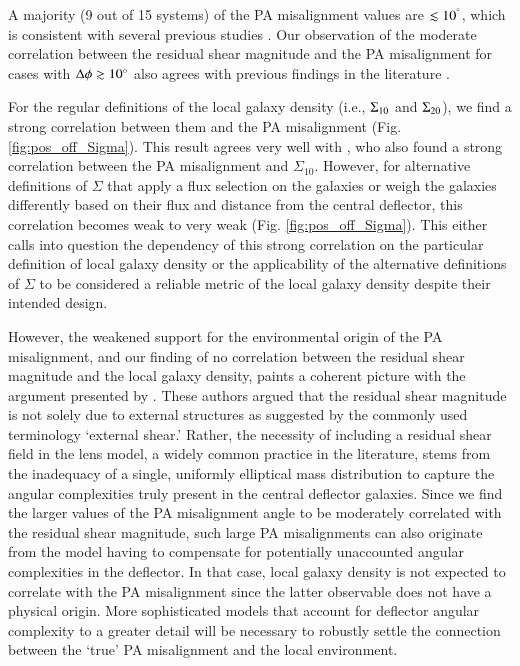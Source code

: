 \documentclass{aa}
\newcommand{\newedit}[1]{{#1}} %
\begin{document}
A majority (9 out of 15 systems) of the PA misalignment values are $\lesssim 10^{^\circ}$, which is consistent with several previous studies \citep{Keeton98b, Kochanek02, Treu09, Gavazzi12, Sluse12, Bruderer16, Shajib19, Shajib21}. \newedit{Our observation of the moderate correlation between the residual shear magnitude and the PA misalignment for cases with $\Delta \phi \gtrsim 10^\circ$ also agrees with previous findings in the literature \citep[e.g.,][]{Bruderer16, Shajib19}. }

For the regular definitions of the local galaxy density (i.e., $\Sigma_{\rm 10}$ and $\Sigma_{\rm 20}$), we find a strong correlation between them and the PA misalignment (Fig. \ref{fig:pos_off_Sigma}). This result agrees very well with \citet{Treu09}, who also found a strong correlation between the PA misalignment and $\Sigma_{10}$. However, for alternative definitions of $\Sigma$ that apply a flux selection on the galaxies or weigh the galaxies differently based on their flux and distance from the central deflector, this correlation becomes weak to very weak (Fig. \ref{fig:pos_off_Sigma}). This either calls into question the dependency of this strong correlation on the particular definition of local galaxy density \newedit{or the applicability of the alternative definitions of $\Sigma$ to be considered a reliable metric of the local galaxy density despite their intended design.} 

However, the weakened support for the environmental origin of the PA misalignment, and our finding of no correlation between the residual shear magnitude and the local galaxy density, paints a coherent picture with the argument presented by \citet{Etherington23}. These authors argued that the residual shear magnitude is not solely due to external structures as suggested by the commonly used terminology `external shear.' Rather, the necessity of including a residual shear field in the lens model, a widely common practice in the literature, stems from the inadequacy of a single, uniformly elliptical mass distribution to capture the angular complexities truly present in the central deflector galaxies. Since we find the larger values of the PA misalignment angle to be moderately correlated with the residual shear magnitude, such large PA misalignments can also originate from the model having to compensate for potentially unaccounted angular complexities in the deflector. In that case, local galaxy density is not expected to correlate with the PA misalignment since the latter observable does not have a physical origin. More sophisticated models that account for deflector angular complexity to a greater detail \citep[e.g.,][]{He24, Amvrosiadis24} will be necessary to robustly settle the connection between the `true' PA misalignment and the local environment.
\end{document}
